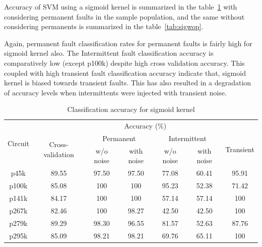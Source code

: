 Accuracy of SVM using a sigmoid kernel is summarized in the table~\ref{tab:sigwp} with considering permanent faults in the sample population, and the same without considering permanents is summarized in the table~\ref{tab:sigwop}.

Again, permanent fault classification rates for permanent faults is fairly high for sigmoid kernel also. The Intermittent fault classification accuracy is comparatively low (except p100k) despite high cross validation accuracy. This coupled with high transient fault classification accuracy indicate that, sigmoid kernel is biased towards transient faults. This has also resulted in a degradation of accuracy levels when intermittents were injected with transient noise.

\begin{table}[h]

	\captionsetup{justification=centering}
\begin{tabular}{ccccccc}
\hline
\multirow{3}{*}{Circuit} & \multicolumn{6}{c}{Accuracy (\%)}\\ \cline{2-7} 
                         & \multirow{2}{*}{Cross-validation} & \multicolumn{2}{c}{Permanent} & \multicolumn{2}{c}{Intermittent} & \multirow{2}{*}{Transient} \\ \cline{3-6}
                         &                                   & w/o noise     & with noise    & w/o noise      & with noise      &                            \\ \hline
p45k                     & 89.55                             & 97.50         & 97.50         & 77.08          & 60.41           & 95.91                      \\
p100k                    & 85.08                             & 100           & 100           & 95.23          & 52.38           & 71.42                      \\
p141k                    & 84.17                             & 100           & 100           & 57.14          & 57.14           & 100                        \\
p267k                    & 82.46                             & 100           & 98.27         & 42.50          & 42.50           & 100                        \\
p279k                    & 89.29                             & 98.30         & 96.55         & 81.57          & 52.63           & 87.76                      \\
p295k                    & 85.09                             & 98.21         & 98.21         & 69.76          & 65.11           & 100                       \\
\hline                                                     
\end{tabular}
\caption {Classification accuracy for sigmoid kernel}
\label{tab:sigwp}
\end{table}

